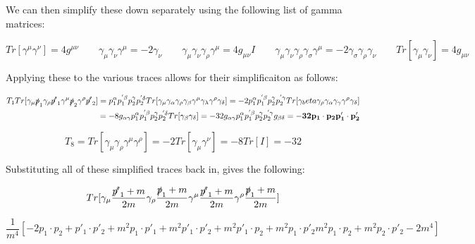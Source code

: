 \documentclass[a4]{article}
\begin{document}
    We can then simplify these down separately using the following list of gamma matrices:

    \begin{equation}
        Tr [\gamma^\mu \gamma^\nu] = 4 g^{\mu \nu} \qquad \gamma_\mu \gamma_\nu \gamma^\mu = -2 \gamma_\nu \qquad \gamma_\mu \gamma_\nu \gamma_\rho \gamma^\mu = 4 g_{\mu \nu} I \qquad \gamma_\mu \gamma_\nu \gamma_\rho \gamma_\sigma \gamma^\mu = -2 \gamma_\sigma \gamma_\rho \gamma_\nu \qquad Tr[\gamma_\mu \gamma_\nu] = 4 g_{\mu \nu}
    \end{equation}

    Applying these to the various traces allows for their simplificaiton as follows:

    \begin{eqnarray}
        T_1 Tr[ \gamma_\mu \slashed{p}_1 \gamma_\rho \slashed{p'}_1 \gamma^\mu \slashed{p}_2 \gamma^\rho \slashed{p'}_2] = p_1^\alpha p_1^{' \beta} p_2^\gamma p_2^{' \delta} Tr [\gamma_\mu \gamma_\alpha \gamma_\rho \gamma_\beta \gamma^\mu \gamma_\lambda \gamma^\rho \gamma_\delta] = -2 p_1^\alpha p_1^{' \beta} p_2^\gamma p_2^{' \gamma} Tr [\gamma_beta \gamma_\rho \gamma_\alpha \gamma_\gamma \gamma^\rho \gamma_\delta] \\
        = -8 g_{\alpha \gamma} p_1^\alpha p_1^{' \beta} p_2^\gamma p_2^{' \delta} Tr[\gamma_\beta \gamma_\delta] = -32 g_{\alpha \gamma} p_1^\alpha p_1^{' \beta} p_2^\gamma p_2^{' \gamma} g_{\beta \delta} = \mathbf{-32 p_1 \cdot p_2 p'_1 \cdot p'_2}
    \end{eqnarray}


    \begin{equation}
        T_8 = Tr [\gamma_\mu \gamma_\rho \gamma^\mu \gamma^\rho] = - 2 Tr [\gamma_\mu \gamma^\nu] = - 8 Tr [I] = -32
    \end{equation}

    Substituting all of these simplified traces back in, gives the following:

    \begin{equation}
        Tr [\gamma_\mu \frac{\slashed{p'}_1 + m}{2m} \gamma_\rho \frac{\slashed{p}_1 + m}{2 m} \gamma^\mu \frac{\slashed{p'}_1 + m}{2m} \gamma^\rho \frac{\slashed{p}_1 + m}{2 m}]
    \end{equation}

    \begin{equation}
        \frac{1}{m^4} [-2 p_1 \cdot p_2 + p'_1 \cdot p'_2 + m^2 p_1 \cdot p'_1 + m^2 p'_1 \cdot p'_2 + m^2 p'_1 \cdot p_2 + m^2 p_1 \cdot p'_2 m^2 p_1 \cdot p_2 + m^2 p_2 \cdot p'_2 - 2 m^4]
    \end{equation}
\end{document}
